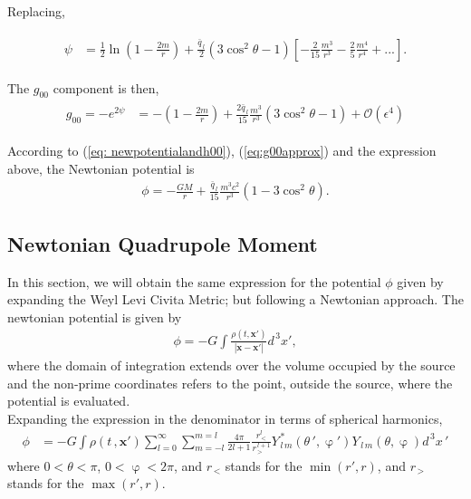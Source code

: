 Replacing,

\begin{align}
\begin{split}
	\psi &= \frac{1}{2}\ln\left(1-\frac{2m}{r}\right) + \frac{\bar{q}_{\, l}}{2}(3\cos^2\theta - 1) \left[-\frac{2}{15}\frac{m^3}{r^3}-\frac{2}{5}\frac{m^4}{r^4} + ...\right].
\end{split}
\end{align}

The $g_{00}$ component is then,
\begin{align}
\begin{split}
	g_{00} = -e^{2\psi} &= -\left(1-\frac{2m}{r}\right) + \frac{2\bar{q}_{\, l}}{15}\frac{m^3}{r^3}(3\cos^2\theta - 1)  + \mathcal{O}(\epsilon^4)
\end{split}
\end{align}

According to (\ref{eq: newpotentialandh00}), (\ref{eq:g00approx}) and the expression above, the Newtonian potential is
\begin{align}
\label{eq: potentialWLC}
	\phi = -\frac{GM}{r} +\frac{\bar{q}_{\, l}}{15}\frac{m^3 c^2}{r^3}(1-3\cos^2\theta ).
\end{align}

\subsection{Newtonian Quadrupole Moment}

In this section, we will obtain the same expression for the potential $\phi$  given by expanding the Weyl Levi Civita Metric; but following a Newtonian approach. The newtonian potential is given by
\begin{align}
\phi = -G \int \frac{\rho(t, \mathbf{x'})}{|\mathbf{x} - \mathbf{x'}|} d^{\,3}x',
\end{align}
where the domain of integration extends over the volume occupied by the source and the non-prime coordinates refers to the point, outside the source, where the potential is evaluated.\\

Expanding the expression in the denominator in terms of spherical harmonics,
\begin{align*}
\phi &= -G \int \rho(t\,, \mathbf{x'}) \sum ^{\infty}_{l =0} \sum ^{m = l}_{m =-l} \frac{4\pi}{2l+1}\frac{r_{\, <}^{l}}{r_{\, >}^{\, l+1}} Y ^ {\,*}_{\,l\,m} (\theta \, ', \upvarphi') Y _{\,l\,m} (\theta, \upvarphi) d^{\,3}x\,'
\end{align*}
where $0<\theta<\pi$, $0<\upvarphi<2\pi$, and $r_{\, <}$ stands for the $\min(r', r)$, and $r_{\, >}$ stands for the $\max(r', r)$.\\

